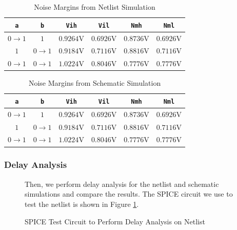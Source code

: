 \documentclass{article}
\begin{document}
	\begin{table}[H]
	\begin{center}
	\caption{Noise Margins from Netlist Simulation}
	\label{table::nand_gate_noise_analysis}
	\begin{tabular}{| c | c | c | c | c | c |}
		\hline
		\texttt{a} & \texttt{b} & \texttt{Vih} & \texttt{Vil} & \texttt{Nmh} & \texttt{Nml} \\
		\hline	
		$0 \rightarrow 1$ & $1$ & $0.9264 \text{V}$ & $0.6926 \text{V}$ & $0.8736 \text{V}$ & $0.6926 \text{V}$\\
		\hline	
		$1$ & $0 \rightarrow 1$ & $0.9184 \text{V}$ & $0.7116 \text{V}$ & $0.8816 \text{V}$ & $0.7116 \text{V}$\\
		\hline	
		$0 \rightarrow 1$ & $0 \rightarrow 1$ & $1.0224 \text{V}$ & $0.8046 \text{V}$ & $0.7776 \text{V}$ & $0.7776 \text{V}$\\
		\hline
	\end{tabular}
	\end{center}
	\end{table}
	
	\begin{table}[H]
	\begin{center}
	\caption{Noise Margins from Schematic Simulation}
	\label{table::nand_gate_noise_analysis_schem}
	\begin{tabular}{| c | c | c | c | c | c |}
		\hline
		\texttt{a} & \texttt{b} & \texttt{Vih} & \texttt{Vil} & \texttt{Nmh} & \texttt{Nml} \\
		\hline	
		$0 \rightarrow 1$ & $1$ & $0.9264 \text{V}$ & $0.6926 \text{V}$ & $0.8736 \text{V}$ & $0.6926 \text{V}$\\
		\hline	
		$1$ & $0 \rightarrow 1$ & $0.9184 \text{V}$ & $0.7116 \text{V}$ & $0.8816 \text{V}$ & $0.7116 \text{V}$\\
		\hline	
		$0 \rightarrow 1$ & $0 \rightarrow 1$ & $1.0224 \text{V}$ & $0.8046 \text{V}$ & $0.7776 \text{V}$ & $0.7776 \text{V}$\\
		\hline
	\end{tabular}
	\end{center}
	\end{table}
	
	\subsubsection{Delay Analysis}
	\begin{figure}[H]
	
	Then, we perform delay analysis for the netlist and schematic simulations and compare the results. The SPICE circuit we use to test the netlist is shown in Figure \ref{fig::nand_delay_analysis_test_circuit}.
		
		\caption{SPICE Test Circuit to Perform Delay Analysis on Netlist}
		\label{fig::nand_delay_analysis_test_circuit}
	\end{figure}
	
\end{document}
